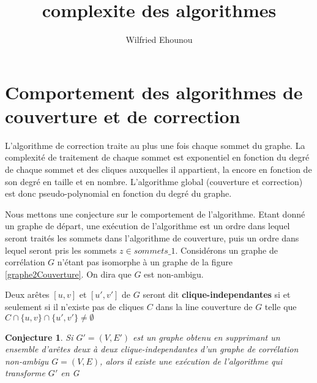 \documentclass[onecolumn, 12pt]{book}
\title{complexite des algorithmes}
\author{Wilfried Ehounou}
\date{\oldstylenums{\today}}
\newtheorem{conjecture}[theorem]{Conjecture}
\begin{document}
\maketitle
\tableofcontents

\section{Comportement des algorithmes de couverture et de correction}
L'algorithme de correction traite au plus une fois chaque sommet du graphe.
La complexit\'e de traitement de chaque sommet est exponentiel en fonction du degr\'e de chaque sommet et des cliques auxquelles il appartient, la encore en fonction  de son degr\'e en taille et en nombre.
L'algorithme global (couverture et correction) est donc pseudo-polynomial en fonction du degr\'e du graphe.
\newline

Nous mettons une conjecture sur le comportement de l'algorithme.
Etant donn\'e un graphe de d\'epart, une ex\'ecution de l'algorithme est un ordre dans lequel seront trait\'es les sommets dans l'algorithme de couverture, puis un ordre dans lequel seront pris les sommets $z \in sommets\_1$.
\newline
Consid\'erons un graphe de corr\'elation $G$ n'\'etant pas isomorphe \`a un graphe de la figure \ref{graphe2Couverture}. On dira que $G$ est non-ambigu.

Deux ar\^etes $[u,v]$ et $[u',v']$ de $G$ seront dit {\bf clique-independantes} si et seulement si il n'existe pas de cliques $C$ dans la line couverture  de $G$ telle que 
$C \cap \{u,v\} \cap \{u',v'\} \ne \emptyset$

\begin{conjecture}
Si $G'=(V, E')$ est un graphe obtenu en supprimant un ensemble d'ar\^etes deux \`a deux clique-independantes d'un graphe de corr\'elation non-ambigu $G=(V,E)$, alors il existe une ex\'ecution de l'algorithme qui transforme $G'$ en G
\end{conjecture}
\end{document}
